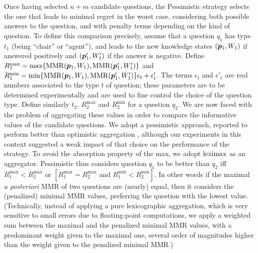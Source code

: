 \documentclass{article}
\begin{document}
\begin{details*}[Pessimistic]
	Once having selected $n + m$ candidate questions, the Pessimistic strategy selects the one that leads to minimal regret in the worst case, considering both possible answers to the question, and with penalty terms depending on the kind of question. To define this comparison precisely, assume that a question $q_1$ has type $t_1$ (being “chair” or “agent”), and leads to the new knowledge states $({\bm{p}}_1, W_1)$ if answered positively and $({\bm{p}}'_1, W'_1)$ if the answer is negative. 
	Define $R^{\max}_1 = \max\{\operatorname{MMR}({\bm{p}}_1, W_1), \operatorname{MMR}({\bm{p}}'_1, W'_1)\}$
	and $R^{\min}_1 = \min\{\operatorname{MMR}({\bm{p}}_1, W_1), \operatorname{MMR}({\bm{p}}'_1, W'_1)\} \epsilon_{t} + \epsilon'_{t}$.
	The terms $\epsilon_t$ and $\epsilon'_{t}$ are real numbers associated to the type $t$ of question; these parameters are to be determined experimentally and are used to fine control the choice of the question type.
	Define similarly $t_2$, $R^{\max}_2$ and $R^{\min}_2$ for a question $q_2$.
	We are now faced with the problem of aggregating these values in order to compare the informative values of the candidate questions. We adopt a pessimistic approach, reported to perform better than optimistic aggregation \citep{Cailloux2014}, although our experiments in this context suggested a weak impact of that choice on the performance of the strategy.
	To avoid the absorption property of the max, we adopt $\operatorname{leximax}$ as an aggregator.
	Pessimistic thus considers question $q_1$ to be better  than $q_2$ iff $R^{\max}_1 < R^{\max}_2 \text{ or } [R^{\max}_1 = R^{\max}_2 \text{ and } R^{\min}_1 < R^{\min}_2]$.
	In other words if the maximal {\em a posteriori} MMR of two questions are (nearly) equal, then it considers the (penalized) minimal MMR values, preferring the question with the lowest value.
	(Technically, instead of applying a pure lexicographic aggregation, which is very sensitive to small errors due to floating-point computations, we apply a weighted sum between the maximal and the penalized minimal MMR values, with a predominant weight given to the maximal one, several order of magnitudes higher than the weight given to the penalized minimal MMR.)
\end{details*}
\end{document}
